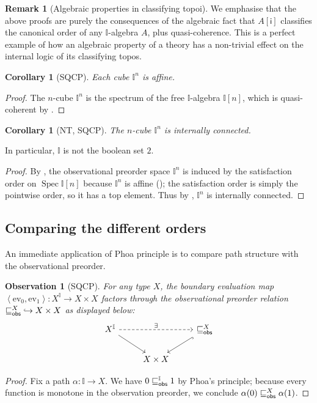 \documentclass[a4paper,12pt]{amsart}
\newtheorem{corollary}[theorem]{Corollary}
\newtheorem{observation}[theorem]{Observation}
\theoremstyle{definition}
\newtheorem{remark}[theorem]{Remark}
\newcommand{\mbb}[1]{\mathbb{#1}}
\newcommand{\I}{\mbb I}
\newcommand{\ms}[1]{\mathsf{#1}}
\newcommand{\pair}[1]{\left\langle#1\right\rangle}
\newcommand{\ev}{\mathrm{ev}}
\newcommand{\hook}{\hookrightarrow}
\newcommand{\spec}{\operatorname{Spec}}
\begin{document}
\begin{remark}[Algebraic properties in classifying topoi]\label{rem:normalalgebra}
  We emphasise that the above proofs are purely the consequences of the algebraic fact that $A[\ms{i}]$ classifies the canonical order of any $\I$-algebra $A$, plus quasi-coherence. This is a perfect example of how an algebraic property of a theory has a non-trivial effect on the internal logic of its classifying topos.
\end{remark}

\begin{corollary}[SQCP]\label{lem:cubes-are-affine}
  Each cube $\I^n$ is affine.
\end{corollary}
\begin{proof}
  The $n$-cube $\I^n$ is the spectrum of the free $\I$-algebra $\I[n]$, which is quasi-coherent by .
\end{proof}

\begin{corollary}[NT, SQCP]\label{cor:cubes-internally-connected}
  The $n$-cube $\I^n$ is internally connected.
\end{corollary}

In particular, $\I$ is not the boolean set $2$.

\begin{proof}
   By , the observational preorder space $\I^n$ is induced by the satisfaction order on $\spec\I[n]$ because $\I^n$ is affine (); the satisfaction order is simply the pointwise order, so it has a top element. Thus by , $\I^n$ is internally connected.
\end{proof}

\subsection{Comparing the different orders}

An immediate application of Phoa principle is to compare path structure with the observational preorder.

\begin{observation}[SQCP]
  For any type $X$, the boundary evaluation map $\pair{\ev_0,\ev_1}\colon X^\I\to X\times X$ factors through the observational preorder relation ${\obsle[X]}\hook X\times X$ as displayed below:
  \[ 
    \begin{tikzcd}
      X^\I 
        \arrow[rr,densely dashed, "\exists"]
        \arrow[dr]
      && 
      {\obsle[X]}
        \arrow[dl,hookrightarrow]
      \\ 
      &
      X\times X
    \end{tikzcd}
  \] 
\end{observation}
\begin{proof}
  Fix a path $\alpha\colon \I\to X$. We have $0\obsle[\I] 1$ by Phoa's principle; because every function is monotone in the observation preorder, we conclude $\alpha(0)\obsle[X] \alpha(1)$.
\end{proof}
\end{document}
